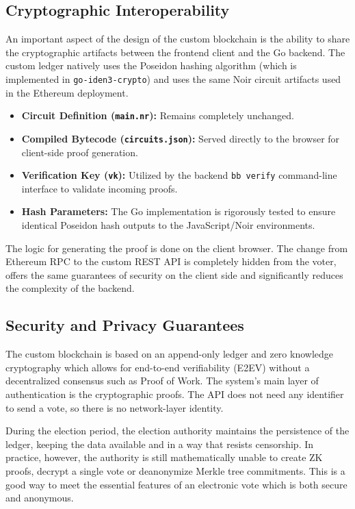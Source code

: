 \documentclass[12pt, a4paper]{report}
\begin{document}
\subsection{Cryptographic Interoperability}

An important aspect of the design of the custom blockchain is the ability to share the cryptographic artifacts between the frontend client and the Go backend. The custom ledger natively uses the Poseidon hashing algorithm (which is implemented in \texttt{go-iden3-crypto}) and uses the same Noir circuit artifacts used in the Ethereum deployment.

\begin{itemize}
    \item \textbf{Circuit Definition (\texttt{main.nr}):} Remains completely unchanged.
    \item \textbf{Compiled Bytecode (\texttt{circuits.json}):} Served directly to the browser for client-side proof generation.
    \item \textbf{Verification Key (\texttt{vk}):} Utilized by the backend \texttt{bb verify} command-line interface to validate incoming proofs.
    \item \textbf{Hash Parameters:} The Go implementation is rigorously tested to ensure identical Poseidon hash outputs to the JavaScript/Noir environments.
\end{itemize}

The logic for generating the proof is done on the client browser. The change from Ethereum RPC to the custom REST API is completely hidden from the voter, offers the same guarantees of security on the client side and significantly reduces the complexity of the backend.

\subsection{Security and Privacy Guarantees}

The custom blockchain is based on an append-only ledger and zero knowledge cryptography which allows for end-to-end verifiability (E2EV) without a decentralized consensus such as Proof of Work. The system's main layer of authentication is the cryptographic proofs. The API does not need any identifier to send a vote, so there is no network-layer identity.

During the election period, the election authority maintains the persistence of the ledger, keeping the data available and in a way that resists censorship. In practice, however, the authority is still mathematically unable to create ZK proofs, decrypt a single vote or deanonymize Merkle tree commitments. This is a good way to meet the essential features of an electronic vote which is both secure and anonymous.
\end{document}
